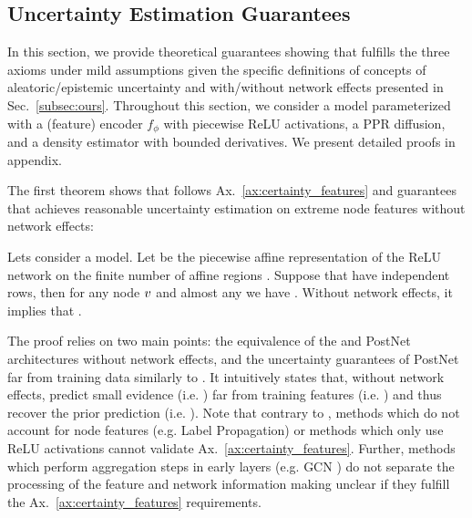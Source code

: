 \subsection{Uncertainty Estimation Guarantees} \label{sec:guarantees}

In this section, we provide theoretical guarantees showing that \GPNacro{} fulfills the three axioms under mild assumptions given the specific definitions of concepts of aleatoric/epistemic uncertainty and with/without network effects presented in Sec.~\ref{subsec:ours}. Throughout this section, we consider a \GPNacro{} model parameterized with a (feature) encoder $f_{\phi}$ with piecewise ReLU activations, a PPR diffusion, and a density estimator  with bounded derivatives. We present detailed proofs in appendix. 

The first theorem shows that \GPNacro{} follows Ax.~\ref{ax:certainty_features} and guarantees that \GPNacro{} achieves reasonable uncertainty estimation on extreme node features without network effects:
\begin{theorem}
\label{thm:axiom-feature}
Lets consider a \GPNacro{} model. Let  be the piecewise affine representation of the ReLU network  on the finite number of affine regions  \cite{understanding-nn-relu}. Suppose that  have independent rows, then for any node $v$ and almost any \smash{$\x\nodeidxv$} we have . Without network effects, it implies that .
\end{theorem}
The proof relies on two main points: the equivalence of the \GPNacro{} and PostNet architectures without network effects, and the uncertainty guarantees of PostNet far from training data similarly to \cite{NatPN2021}. It intuitively states that, without network effects, \GPNacro{} predict small evidence (i.e. ) far from training features (i.e. \smash{$||\delta \cdot \x\nodeidxv|| \rightarrow \infty$}) and thus recover the prior prediction (i.e. ). 
Note that contrary to \GPNacro{}, methods which do not account for node features (e.g. Label Propagation) or methods which only use ReLU activations \cite{overconfident-relu} cannot validate Ax.~\ref{ax:certainty_features}. Further, methods which perform aggregation steps in early layers (e.g. GCN \citep{Kipf2016}) do not separate the processing of the feature and network information making unclear if they fulfill the Ax.~\ref{ax:certainty_features} requirements. 


